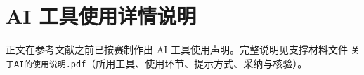 \section{AI 工具使用详情说明}

正文在参考文献之前已按赛制作出 AI 工具使用声明。完整说明见支撑材料文件 \texttt{关于AI的使用说明.pdf}（所用工具、使用环节、提示方式、采纳与核验）。
